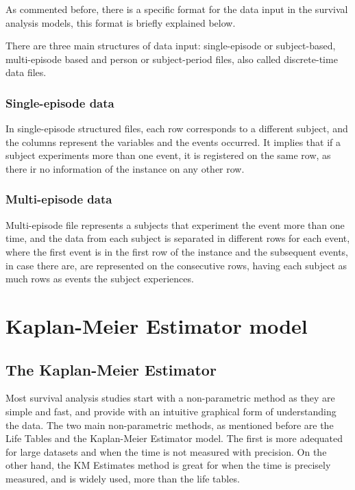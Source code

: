 \documentclass[11pt]{book} %
\begin{document}
      As commented before, there is a specific format for the data input in the survival analysis models, this format is briefly explained below.

      There are three main structures of data input: single-episode or subject-based, multi-episode based and person or subject-period files, also called discrete-time data files.

      \subsubsection{Single-episode data}

        In single-episode structured files, each row corresponds to a different subject, and the columns represent the variables and the events occurred. It implies that if a subject experiments more than one event, it is registered on the same row, as there ir no information of the instance on any other row.

      \subsubsection{Multi-episode data}

        Multi-episode file represents a subjects that experiment the event more than one time, and the data from each subject is separated in different rows for each event, where the first event is in the first row of the instance and the subsequent events, in case there are, are represented on the consecutive rows, having each subject as much rows as events the subject experiences.

  \section{Kaplan-Meier Estimator model}

    \subsection{The Kaplan-Meier Estimator}


    Most survival analysis studies start with a non-parametric method as they are simple and fast, and provide with an intuitive graphical form of understanding the data. The two main non-parametric methods, as mentioned before are the Life Tables and the Kaplan-Meier Estimator model. The first is more adequated for large datasets and when the time is not measured with precision. On the other hand, the KM Estimates method is great for when the time is precisely measured, and is widely used, more than the life tables.
\end{document}
